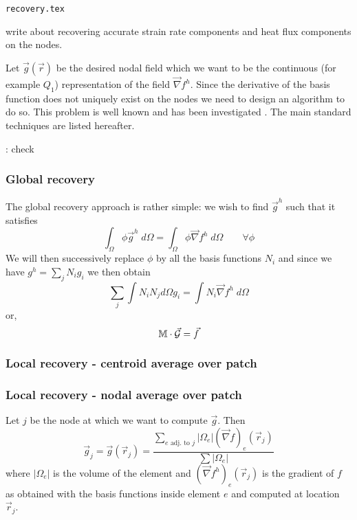 \begin{flushright} {\tiny {\color{gray} \tt recovery.tex}} \end{flushright}

write about recovering accurate strain rate components and heat flux components on the nodes.

Let $\vec g(\vec r)$  be the desired nodal 
field which we want to be the continuous (for example $Q_1$) 
representation of the field $\vec \nabla f^h$.
Since the derivative of the basis function does not uniquely exist on the nodes we need to design
an algorithm to do so. This problem is well known and has been investigated 
.
The main standard techniques are listed hereafter.

\Literature: check 

\subsubsection{Global recovery}

The global recovery approach is rather simple: we wish to find $\vec g^h$
such that it satisfies
\[
\int_\Omega \phi \vec g^h \; d\Omega  = \int_\Omega \phi \vec\nabla f^h \; d\Omega 
\quad\quad \forall \phi
\] 
We will then successively replace $\phi$ by all the basis functions $N_i$ 
and since we have $g^h=\sum_j N_i g_i$ we then obtain
\[
\sum_j \int N_i N_j d\Omega g_i = \int N_i  \vec\nabla f^h \; d\Omega 
\]
or, 
\[
\mathbb{M} \cdot \vec{\cal G} = \vec f
\]



\subsubsection{Local recovery - centroid average over patch}





\subsubsection{Local recovery - nodal average over patch}

Let $j$ be the node at which we want to compute $\vec g$.
Then 
\[
\vec g_j = \vec g(\vec r_j) = 
\frac{\sum\limits_{ e \text{ adj. to }j} |\Omega_e| (\vec\nabla f)_e(\vec r_j) }{\sum |\Omega_e|}
\]
where $|\Omega_e|$ is the volume of the element and $(\vec\nabla f^h)_e(\vec r_j)$
is the gradient of $f$ as obtained with the basis functions inside element $e$ and 
computed at location $\vec r_j$.

